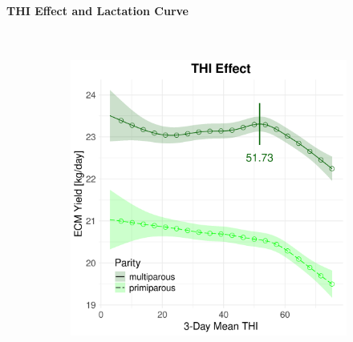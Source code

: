 \newpage
\paragraph{THI Effect and Lactation Curve} \quad \\
\begin{figure}[H]
    \centering
    \begin{subfigure}[b]{0.45\textwidth}
        \centering
        \includegraphics[width=\textwidth]{thesis/figures/models/ecm/before2010/je_ecm_before2010/je_ecm_before2010_marginal_thi_milk_combined.png}
    \end{subfigure}
    \hspace{0.05\textwidth} %
    \begin{subfigure}[b]{0.45\textwidth}
        \centering

\end{subfigure}
\end{figure}
